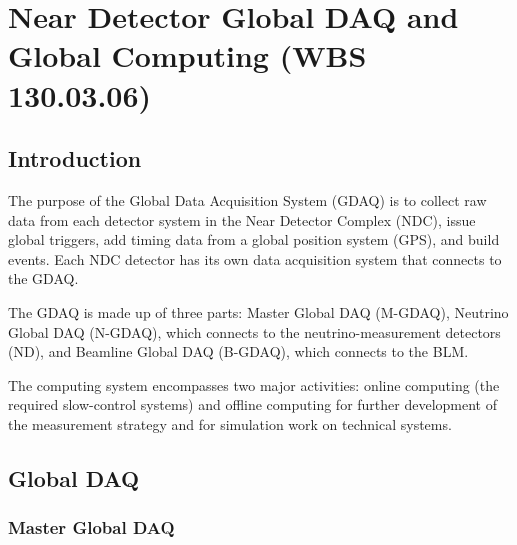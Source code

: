 \chapter{Near Detector Global DAQ and Global Computing (WBS 130.03.06)}
\label{ch:global-daq}


\section{Introduction}
\label{sec:gdac-intro}

The purpose of the Global Data Acquisition System (GDAQ) is to collect 
raw data from each detector system in the Near Detector Complex (NDC), 
issue global triggers, add timing data from a global position system 
(GPS), and build events. Each NDC detector has its own data acquisition 
system that connects to the GDAQ.  

The GDAQ is made up of three parts: 
Master Global DAQ (M-GDAQ), Neutrino Global DAQ (N-GDAQ), which connects to the neutrino-measurement detectors (ND), and Beamline 
Global DAQ (B-GDAQ), which connects to the BLM.


The computing system encompasses two major activities: online computing (the required
slow-control systems) and offline computing for further development of the measurement strategy and for simulation work on technical systems.

\section{Global DAQ}

\subsection{Master Global DAQ}
\label{subsec:M-GDAQ}

